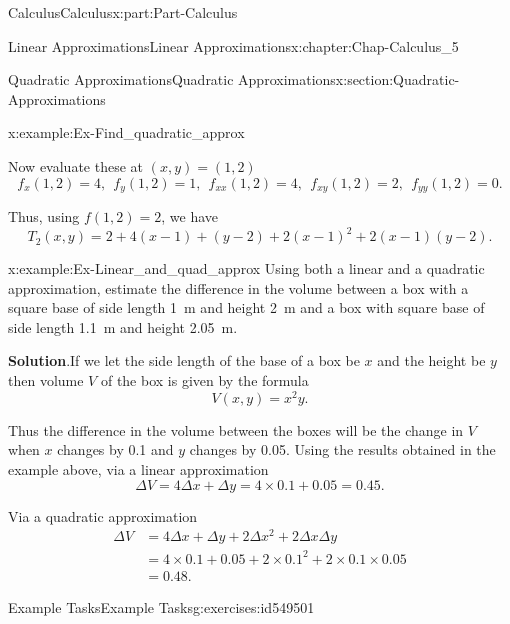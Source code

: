 \documentclass[oneside,10pt,]{book}
\newcommand{\blocktitlefont}{\relax}
\numberwithin{equation}{section}
\newcommand{\amp}{&}
\begin{document}
\begin{partptx}{Calculus}{}{Calculus}{}{}{x:part:Part-Calculus}
\begin{chapterptx}{Linear Approximations}{}{Linear Approximations}{}{}{x:chapter:Chap-Calculus_5}
\begin{sectionptx}{Quadratic Approximations}{}{Quadratic Approximations}{}{}{x:section:Quadratic-Approximations}
\begin{example}{}{x:example:Ex-Find_quadratic_approx}
\begin{equation*}
\end{equation*}
%
\par
Now evaluate these at \((x,y) = (1,2)\)%
\begin{equation*}
f_x(1,2) = 4, \: \: f_y(1,2) = 1, \: \: f_{xx}(1,2) = 4, \: \: f_{xy}(1,2) = 2, \: \: f_{yy}(1,2) = 0.
\end{equation*}
%
\par
Thus, using \(f(1,2) = 2\), we have%
\begin{equation*}
T_2(x,y) = 2+4(x-1)+(y-2)+2(x-1)^2+2(x-1)(y-2)\text{.}
\end{equation*}
%
\end{example}
\begin{example}{}{x:example:Ex-Linear_and_quad_approx}%
Using both a linear and a quadratic approximation, estimate the difference in the volume between a box with a square base of side length \SI{1}{\meter} and height \SI{2}{\meter} and a box with square base of side length \SI{1.1}{\meter} and height \SI{2.05}{\meter}.%
\par\smallskip%
\noindent\textbf{\blocktitlefont Solution}.\hypertarget{g:solution:id549487}{}\quad{}If we let the side length of the base of a box be \(x\) and the height be \(y\) then volume \(V\) of the box is given by the formula%
\begin{equation*}
V(x,y) = x^2y\text{.}
\end{equation*}
%
\par
Thus the difference in the volume between the boxes will be the change in \(V\) when \(x\) changes by 0.1 and \(y\) changes by 0.05. Using the results obtained in the example above, via a linear approximation%
\begin{equation*}
\Delta V = 4 \Delta x + \Delta y = 4 \times 0.1 + 0.05 = 0.45\text{.}
\end{equation*}
%
\par
Via a quadratic approximation%
\begin{align*}
\Delta V \amp = 4 \Delta x + \Delta y + 2 \Delta x^2 + 2\Delta x \Delta y \\
\amp = 4 \times 0.1 + 0.05 +2 \times 0.1^2 + 2 \times 0.1 \times 0.05 \\
\amp = 0.48\text{.}
\end{align*}
%
\end{example}
%
%
\typeout{************************************************}
\typeout{************************************************}
%
\begin{exercises-subsection-numberless}{Example Tasks}{}{Example Tasks}{}{}{g:exercises:id549501}

\end{exercises-subsection-numberless}
\end{sectionptx}
\end{chapterptx}
\end{partptx}
\end{document}
